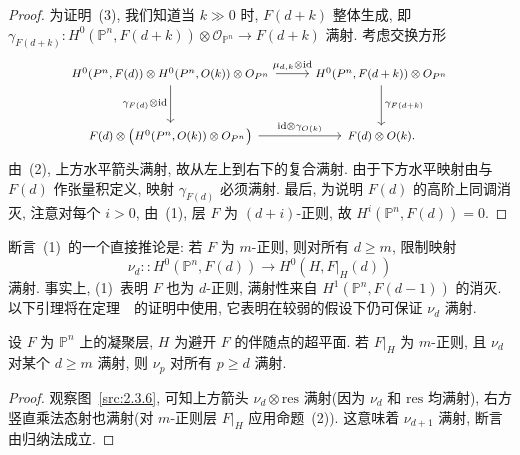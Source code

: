 \begin{proof}
为证明~(3), 我们知道当 $k\gg0$ 时, $F(d+k)$ 整体生成, 即
$\gamma_{F(d+k)}:H^0(\mathbb P^n,F(d+k))\otimes\mathcal O_{\mathbb P^n}\to F(d+k)$
满射.
考虑交换方形
\[
\begin{tikzcd}[column sep=normal,row sep=large,font=\footnotesize]
H^0(\mathbb P^n,F(d))\otimes H^0(\mathbb P^n,\mathcal O(k))
\otimes\mathcal O_{\mathbb P^n}
\arrow[r,"\mu_{d,k}\otimes\mathrm{id}"]
\arrow[d,"\gamma_{F(d)}\otimes\mathrm{id}"']&
H^0(\mathbb P^n,F(d+k))\otimes\mathcal O_{\mathbb P^n}
\arrow[d,"\gamma_{F(d+k)}"]\\
F(d)\otimes\bigl(H^0(\mathbb P^n,\mathcal O(k))\otimes\mathcal O_{\mathbb P^n}\bigr)
\arrow[r,"\mathrm{id}\otimes\gamma_{\mathcal O(k)}"]&
F(d)\otimes\mathcal O(k).
\end{tikzcd}
\]
由~(2), 上方水平箭头满射, 故从左上到右下的复合满射.
由于下方水平映射由与 $F(d)$ 作张量积定义, 映射 $\gamma_{F(d)}$ 必须满射.
最后, 为说明 $F(d)$ 的高阶上同调消灭, 注意对每个 $i>0$, 由~(1), 层 $F$ 为 $(d+i)$-正则, 故 $H^i(\mathbb P^n,F(d))=0$.
\end{proof}
断言~(1)~的一个直接推论是: 若 $F$ 为 $m$-正则, 则对所有 $d\geq m$, 限制映射
\[
\nu_d::H^0(\mathbb P^n,F(d))\longrightarrow H^0(H,F|_H(d))
\]
满射. 事实上, (1)~表明 $F$ 也为 $d$-正则, 满射性来自 $H^1(\mathbb P^n,F(d-1))$ 的消灭.
以下引理将在定理~~的证明中使用, 它表明在较弱的假设下仍可保证 $\nu_d$ 满射.
\begin{lemma}\label{src:2.3.7}
设 $F$ 为 $\mathbb P^n$ 上的凝聚层, $H$ 为避开 $F$ 的伴随点的超平面.
若 $F|_H$ 为 $m$-正则, 且 $\nu_d$ 对某个 $d\geq m$ 满射, 则 $\nu_p$ 对所有 $p\geq d$ 满射.
\end{lemma}
\begin{proof}
观察图~\eqref{src:2.3.6}, 可知上方箭头 $\nu_d\otimes\mathrm{res}$ 满射(因为 $\nu_d$ 和 $\mathrm{res}$ 均满射), 右方竖直乘法态射也满射(对 $m$-正则层 $F|_H$ 应用命题~(2)).
这意味着 $\nu_{d+1}$ 满射, 断言由归纳法成立.
\end{proof}
